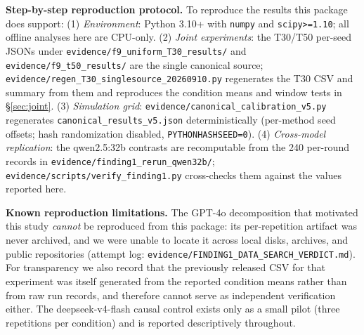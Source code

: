 \documentclass[11pt]{article}
\theoremstyle{definition}
\theoremstyle{remark}
\begin{document}
\textbf{Step-by-step reproduction protocol.} To reproduce the results this package does support: (1) \textit{Environment}: Python 3.10+ with \texttt{numpy} and \texttt{scipy>=1.10}; all offline analyses here are CPU-only. (2) \textit{Joint experiments}: the T30/T50 per-seed JSONs under \texttt{evidence/f9\_uniform\_T30\_results/} and \texttt{evidence/f9\_t50\_results/} are the single canonical source; \texttt{evidence/regen\_T30\_singlesource\_20260910.py} regenerates the T30 CSV and summary from them and reproduces the condition means and window tests in \S\ref{sec:joint}. (3) \textit{Simulation grid}: \texttt{evidence/canonical\_calibration\_v5.py} regenerates \texttt{canonical\_results\_v5.json} deterministically (per-method seed offsets; hash randomization disabled, \texttt{PYTHONHASHSEED=0}). (4) \textit{Cross-model replication}: the qwen2.5:32b contrasts are recomputable from the 240 per-round records in \texttt{evidence/finding1\_rerun\_qwen32b/}; \texttt{evidence/scripts/verify\_finding1.py} cross-checks them against the values reported here.

\textbf{Known reproduction limitations.} The GPT-4o decomposition that motivated this study \emph{cannot} be reproduced from this package: its per-repetition artifact was never archived, and we were unable to locate it across local disks, archives, and public repositories (attempt log: \texttt{evidence/FINDING1\_DATA\_SEARCH\_VERDICT.md}). For transparency we also record that the previously released CSV for that experiment was itself generated from the reported condition means rather than from raw run records, and therefore cannot serve as independent verification either. The deepseek-v4-flash causal control exists only as a small pilot (three repetitions per condition) and is reported descriptively throughout.



\end{document}
